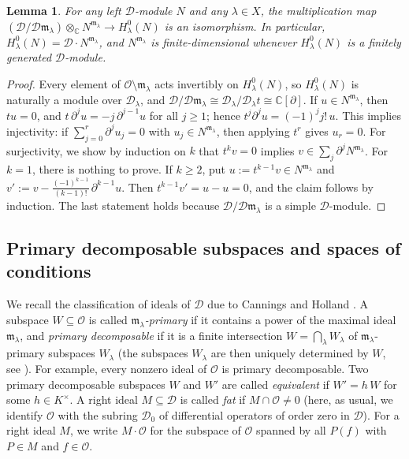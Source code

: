 \documentclass[11pt,reqno]{amsart}
\theoremstyle{plain}
\newtheorem{lemma}{Lemma}[section]
\theoremstyle{definition}
\theoremstyle{remark}
\numberwithin{equation}{section}
\newcommand{\cD}{\mathcal{D}}
\newcommand{\cO}{\mathcal{O}}
\newcommand{\C}{\mathbb{C}}
\newcommand{\del}{\partial}
\newcommand{\ml}{\mathfrak{m}_\lambda}
\begin{document}
\begin{lemma}
\label{L2.5}
For any left $\cD$-module $N$ and any $\lambda \in X$, the multiplication map
$(\cD/\cD \ml) \otimes_{\C} N^{\ml} \to H^0_\lambda(N)$ is an isomorphism. In particular,
$H^0_\lambda(N) = \cD \cdot N^{\ml}$, and $N^{\ml}$ is finite-dimensional whenever $H^0_\lambda(N)$
is a finitely generated $\cD$-module.
\end{lemma}

\begin{proof}
Every element of $\cO \setminus \ml$ acts invertibly on $H^0_\lambda(N)$, so $H^0_\lambda(N)$ is
naturally a module over $\cD_\lambda$, and $\cD/\cD \ml \cong \cD_\lambda/\cD_\lambda t \cong
\C[\del]$. If $u \in N^{\ml}$, then $t u = 0$, and $t\, \del^j u = - j\, \del^{j-1} u$ for all
$j \ge 1$; hence $t^j \del^j u = (-1)^j j!\, u$. This implies injectivity: if $\sum_{j=0}^r \del^j
u_j = 0$ with $u_j \in N^{\ml}$, then applying $t^r$ gives $u_r = 0$. For surjectivity, we show by
induction on $k$ that $t^k v = 0$ implies $v \in \sum_j \del^j N^{\ml}$. For $k = 1$, there is
nothing to prove. If $k \ge 2$, put $u := t^{k-1} v \in N^{\ml}$ and
$v' := v - \frac{(-1)^{k-1}}{(k-1)!}\, \del^{k-1} u$. Then $t^{k-1} v' = u - u = 0$, and the claim
follows by induction. The last statement holds because $\cD/\cD \ml$ is a simple $\cD$-module.
\end{proof}

\subsection{Primary decomposable subspaces and spaces of conditions}
\label{S2.4}
We recall the classification of ideals of $\cD$ due to Cannings and Holland
\cite{CanningsHolland1994}. A subspace $W \subseteq \cO$ is called \emph{$\ml$-primary} if it
contains a power of the maximal ideal $\ml$, and \emph{primary decomposable} if it is a finite
intersection $W = \bigcap_{\lambda} W_\lambda$ of $\ml$-primary subspaces $W_\lambda$ (the
subspaces $W_\lambda$ are then uniquely determined by $W$, see
\cite[Theorem~2.4]{CanningsHolland1994}). For example, every nonzero ideal of $\cO$ is primary
decomposable. Two primary decomposable subspaces $W$ and $W'$ are called \emph{equivalent} if
$W' = h\,W$ for some $h \in K^\times$. A right ideal $M \subseteq \cD$ is called \emph{fat} if
$M \cap \cO \ne 0$ (here, as usual, we identify $\cO$ with the subring $\cD_0$ of differential
operators of order zero in $\cD$). For a right ideal $M$, we write $M \cdot \cO$ for the subspace of $\cO$ spanned
by all $P(f)$ with $P \in M$ and $f \in \cO$.
\end{document}
